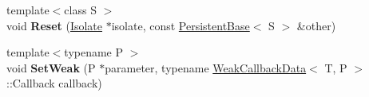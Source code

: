 \begin{DoxyCompactItemize}
\item 
\hypertarget{classv8_1_1PersistentBase_a67cbcedf77d176d3870fa4993e300b61}{}{\footnotesize template$<$class S $>$ }\\void {\bfseries Reset} (\hyperlink{classv8_1_1Isolate}{Isolate} $\ast$isolate, const \hyperlink{classv8_1_1PersistentBase}{Persistent\+Base}$<$ S $>$ \&other)\label{classv8_1_1PersistentBase_a67cbcedf77d176d3870fa4993e300b61}

\item 
\hypertarget{classv8_1_1PersistentBase_aaf342ece1a4ba926ba62e8d6af7be777}{}{\footnotesize template$<$typename P $>$ }\\void {\bfseries Set\+Weak} (P $\ast$parameter, typename \hyperlink{classv8_1_1WeakCallbackData}{Weak\+Callback\+Data}$<$ T, P $>$\+::Callback callback)\label{classv8_1_1PersistentBase_aaf342ece1a4ba926ba62e8d6af7be777}

\end{DoxyCompactItemize}
